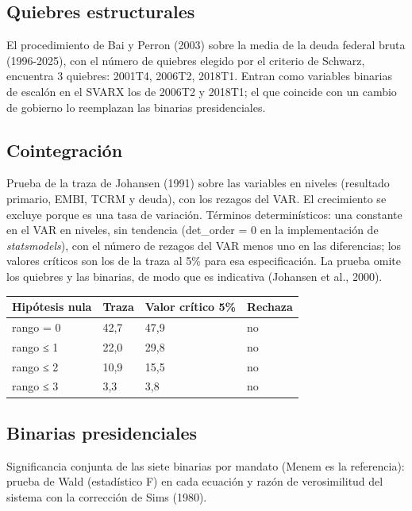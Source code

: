 \subsection{Quiebres estructurales}

El procedimiento de Bai y Perron (2003) sobre la media de la deuda
federal bruta (1996-2025), con el número de quiebres elegido por el
criterio de Schwarz, encuentra 3 quiebres: 2001T4, 2006T2, 2018T1.
Entran como variables binarias de escalón en el SVARX los de 2006T2 y
2018T1; el que coincide con un cambio de gobierno lo reemplazan las
binarias presidenciales.

\subsection{Cointegración}

Prueba de la traza de Johansen (1991) sobre las variables en niveles
(resultado primario, EMBI, TCRM y deuda), con los rezagos del VAR. El
crecimiento se excluye porque es una tasa de variación. Términos
determinísticos: una constante en el VAR en niveles, sin tendencia
(det\_order = 0 en la implementación de \emph{statsmodels}), con el
número de rezagos del VAR menos uno en las diferencias; los valores
críticos son los de la traza al 5\% para esa especificación. La prueba
omite los quiebres y las binarias, de modo que es indicativa (Johansen
et al., 2000).

\begin{longtable}[]{@{}llll@{}}
\toprule\noalign{}
Hipótesis nula & Traza & Valor crítico 5\% & Rechaza \\
\midrule\noalign{}
\endhead
\bottomrule\noalign{}
\endlastfoot
rango = 0 & 42,7 & 47,9 & no \\
rango ≤ 1 & 22,0 & 29,8 & no \\
rango ≤ 2 & 10,9 & 15,5 & no \\
rango ≤ 3 & 3,3 & 3,8 & no \\
\end{longtable}

\subsection{Binarias presidenciales}

Significancia conjunta de las siete binarias por mandato (Menem es la
referencia): prueba de Wald (estadístico F) en cada ecuación y razón de
verosimilitud del sistema con la corrección de Sims (1980).

